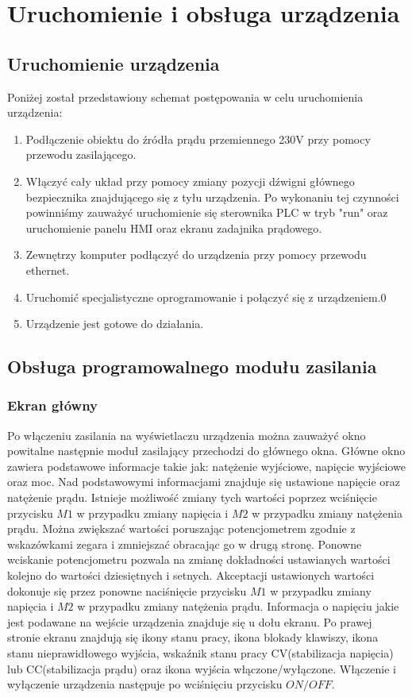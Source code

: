 \documentclass[oneside]{mgr}
\begin{document}
\section{Uruchomienie i obsługa urządzenia}
\subsection{Uruchomienie urządzenia}
Poniżej został przedstawiony schemat postępowania w celu uruchomienia urządzenia:
\begin{enumerate}
    \item Podłączenie obiektu do źródła prądu przemiennego 230V przy pomocy przewodu zasilającego.
    \item Włączyć cały układ przy pomocy zmiany pozycji dźwigni głównego bezpiecznika  znajdującego się z tyłu urządzenia. Po wykonaniu tej czynności powinniśmy zauważyć uruchomienie się sterownika PLC w tryb "run" oraz uruchomienie panelu HMI oraz ekranu zadajnika prądowego.
    \item Zewnętrzy komputer podłączyć do urządzenia przy pomocy przewodu ethernet.
    \item Uruchomić specjalistyczne oprogramowanie i połączyć się z urządzeniem.0
    \item Urządzenie jest gotowe do działania.
\end{enumerate}

\subsection{Obsługa programowalnego modułu zasilania}
\subsubsection{Ekran główny}
Po włączeniu zasilania na wyświetlaczu urządzenia można zauważyć okno powitalne następnie moduł zasilający przechodzi do głównego okna. Główne okno zawiera podstawowe informacje takie jak: natężenie wyjściowe, napięcie wyjściowe oraz moc. Nad podstawowymi informacjami znajduje się ustawione napięcie oraz natężenie prądu. Istnieje możliwość zmiany tych wartości poprzez wciśnięcie przycisku $M1$ w przypadku zmiany napięcia i $M2$ w przypadku zmiany natężenia prądu. Można zwiększać wartości poruszając potencjometrem zgodnie z wskazówkami zegara i zmniejszać obracając go w drugą stronę. Ponowne wciskanie potencjometru pozwala na zmianę dokładności ustawianych wartości kolejno do wartości dziesiętnych i setnych. Akceptacji ustawionych wartości dokonuje się przez ponowne naciśnięcie przycisku $M1$ w przypadku zmiany napięcia i $M2$ w przypadku zmiany natężenia prądu. Informacja o napięciu jakie jest podawane na wejście urządzenia znajduje się u dołu ekranu. Po prawej stronie ekranu znajdują się ikony stanu pracy, ikona blokady klawiszy, ikona stanu nieprawidłowego wyjścia, wskaźnik stanu pracy CV(stabilizacja napięcia) lub CC(stabilizacja prądu) oraz ikona wyjścia włączone/wyłączone. Włączenie i wyłączenie urządzenia następuje po wciśnięciu przycisku $ON/OFF$.
\end{document}
